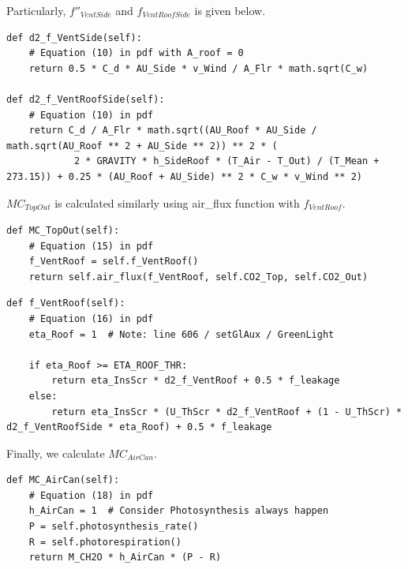 \documentclass[a4paper]{article}
\numberwithin{equation}{section}
\begin{document}
Particularly, \( f''_{VentSide} \) and \( f_{VentRoofSide} \) is given below.
\begin{mdframed}[leftline=false,rightline=false,backgroundcolor=magenta!10,nobreak=true]
  \begin{verbatim}
def d2_f_VentSide(self):
    # Equation (10) in pdf with A_roof = 0
    return 0.5 * C_d * AU_Side * v_Wind / A_Flr * math.sqrt(C_w)
    
def d2_f_VentRoofSide(self):
    # Equation (10) in pdf
    return C_d / A_Flr * math.sqrt((AU_Roof * AU_Side / math.sqrt(AU_Roof ** 2 + AU_Side ** 2)) ** 2 * (
            2 * GRAVITY * h_SideRoof * (T_Air - T_Out) / (T_Mean + 273.15)) + 0.25 * (AU_Roof + AU_Side) ** 2 * C_w * v_Wind ** 2)
  \end{verbatim}
\end{mdframed}

\( MC_{TopOut} \) is calculated similarly using air\_flux function with \( f_{VentRoof} \).
\begin{mdframed}[leftline=false,rightline=false,backgroundcolor=magenta!10,nobreak=true]
  \begin{verbatim}
def MC_TopOut(self):
    # Equation (15) in pdf
    f_VentRoof = self.f_VentRoof()
    return self.air_flux(f_VentRoof, self.CO2_Top, self.CO2_Out)
  \end{verbatim}
\end{mdframed}

\begin{mdframed}[leftline=false,rightline=false,backgroundcolor=magenta!10,nobreak=true]
  \begin{verbatim}
def f_VentRoof(self):
    # Equation (16) in pdf
    eta_Roof = 1  # Note: line 606 / setGlAux / GreenLight
    
    if eta_Roof >= ETA_ROOF_THR:
        return eta_InsScr * d2_f_VentRoof + 0.5 * f_leakage
    else:
        return eta_InsScr * (U_ThScr * d2_f_VentRoof + (1 - U_ThScr) * d2_f_VentRoofSide * eta_Roof) + 0.5 * f_leakage
  \end{verbatim}
\end{mdframed}

Finally, we calculate \( MC_{AirCan} \).
\begin{mdframed}[leftline=false,rightline=false,backgroundcolor=magenta!10,nobreak=true]
  \begin{verbatim}
def MC_AirCan(self):
    # Equation (18) in pdf
    h_AirCan = 1  # Consider Photosynthesis always happen
    P = self.photosynthesis_rate()
    R = self.photorespiration()
    return M_CH2O * h_AirCan * (P - R)
  \end{verbatim}
\end{mdframed}
\end{document}
